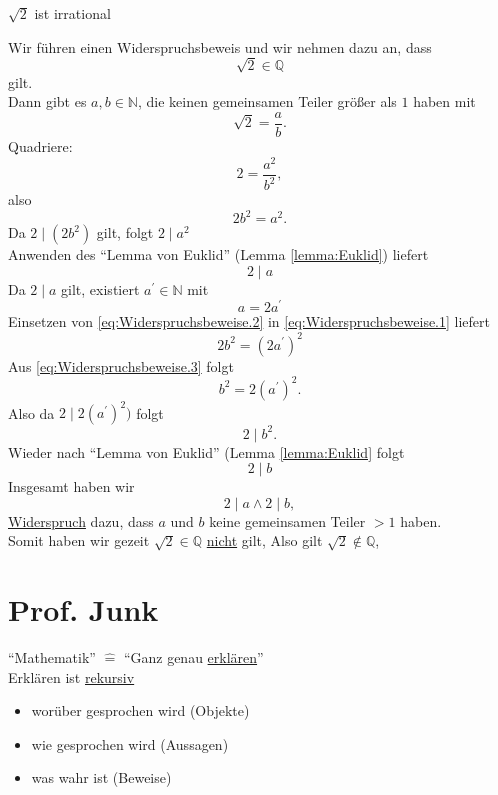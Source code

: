 \documentclass[a4paper, parskip = true, fleqn, headsepline = true]{scrartcl}
\newcommand{\qed}{\tag{$\square$}}
\DeclareRobustCommand{\qed}{%
	\ifmmode \tag*{$\square$}%
	\else \leavevmode\unskip\penalty9999 \hbox{}\nobreak\hfill\quad\hbox{$\square$}%
	\fi%
}
\begin{document}
\begin{subtheorem}
	\label{theorem:Sqrt2IstIrrational}
	$ \sqrt{2} $ ist irrational
\end{subtheorem}
\begin{subproof}
	Wir führen einen Widerspruchsbeweis und wir nehmen dazu an, dass
	\[ \sqrt{2} \in \mathbb{Q} \]
	gilt.\\
	Dann gibt es $ a, b \in \mathbb{N} $, die keinen gemeinsamen Teiler größer als $ 1 $ haben mit
	\[ \sqrt{2} = \frac{a}{b}. \]
	Quadriere:
	\[ 2 = \frac{a^2}{b^2}, \]
	also
	\begin{equation}
		\label{eq:Widerspruchsbeweise.1}
		2b^2 = a^2.
	\end{equation}
	Da $ 2 \mid ( 2b^2 ) $ gilt, folgt $ 2 \mid a^2 $\\
	Anwenden des ``Lemma von Euklid'' (Lemma \ref{lemma:Euklid}) liefert
	\[ 2 \mid a \]
	Da $ 2 \mid a $ gilt, existiert $ a^{\prime} \in \mathbb{N} $ mit
	\begin{equation}
		\label{eq:Widerspruchsbeweise.2}
		a = 2 a^{\prime}
	\end{equation}
	Einsetzen von \ref{eq:Widerspruchsbeweise.2} in \ref{eq:Widerspruchsbeweise.1} liefert
	\begin{equation}
		\label{eq:Widerspruchsbeweise.3}
		2b^2 = ( 2a^{\prime} )^2
	\end{equation}
	Aus \ref{eq:Widerspruchsbeweise.3} folgt
	\[ b^2 = 2 ( a^{\prime} )^2. \]
	Also da $ 2 \mid 2 ( a^{\prime} )^2 ) $ folgt
	\[ 2 \mid b^2. \]
	Wieder nach ``Lemma von Euklid'' (Lemma \ref{lemma:Euklid} folgt
	\[ 2 \mid b \]
	Insgesamt haben wir
	\[ 2\mid a \wedge 2 \mid b, \]
	\underline{Widerspruch} dazu, dass $ a $ und $ b $ keine gemeinsamen Teiler $ >1 $ haben.\\
	Somit haben wir gezeit $ \sqrt{2} \in \mathbb{Q} $ \underline{nicht} gilt, Also gilt $ \sqrt{2} \notin \mathbb{Q} $, \qed
\end{subproof}

\section{Prof. Junk}
``Mathematik'' $ \hat= $ ``Ganz genau \underline{erklären}''\\
Erklären ist \underline{rekursiv}
\begin{itemize}
	\item worüber gesprochen wird (Objekte)
	\item wie gesprochen wird (Aussagen)
	\item was wahr ist (Beweise)
\end{itemize}
\end{document}
